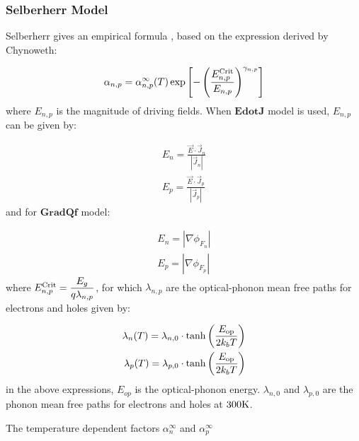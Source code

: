 \documentclass[oneside,12pt]{cgd_book}
\begin{document}
\subsubsection{Selberherr Model}
Selberherr gives an empirical formula
\cite[Selberherr1984]{}, based on the
          expression derived by Chynoweth\cite[Chynoweth1958]{}:
\par
\begin{equation}
\alpha _{n,p} = \alpha _{n,p}^\infty (T)\exp \left[ - \left( \frac{E_{n,p}^{\rm Crit} }{E_{n,p}
            } \right)^{\gamma_{n,p}} \right]
\end{equation}
where $E_{n,p}$ is the magnitude of driving fields. When $\mathbf{EdotJ}$
model is used, $E_{n,p}$ can be given by:
\par
\begin{subequations}
\begin{align}
 E_n = \frac{ \vec{E} \cdot \vec{J}_n } { \left\vert \vec{J}_n \right\vert }\\
 E_p = \frac{ \vec{E} \cdot \vec{J}_p } { \left\vert \vec{J}_p \right\vert }
\end{align}
\end{subequations}
and for $\mathbf{GradQf}$ model:
\par
\begin{subequations}
\begin{align}
 E_n = \left\vert \nabla \phi_{F_n} \right\vert \\
 E_p = \left\vert \nabla \phi_{F_p} \right\vert
\end{align}
\end{subequations}
where $E_{n,p}^{\rm Crit}=\dfrac{E_g}{q\lambda_{n,p}}$, for which
$\lambda_{n,p}$ are the optical-phonon mean free paths for electrons and holes given
          by:
\par
\begin{subequations}
\begin{align}
 \lambda_n (T) = \lambda_{n,0} \cdot \tanh \left( \dfrac{E_{\rm op}}{2k_b T} \right) \\
 \lambda_p (T) = \lambda_{p,0} \cdot \tanh \left( \dfrac{E_{\rm op}}{2k_b T} \right)
\end{align}
\end{subequations}
in the above expressions, $E_{op}$ is the optical-phonon energy.
$\lambda_{n,0}$ and $\lambda_{p,0}$ are the phonon mean free
          paths for electrons and holes at $300\text{K}$.
\par
The temperature dependent factors $\alpha_n^\infty$ and $\alpha_p^\infty$
\end{document}
